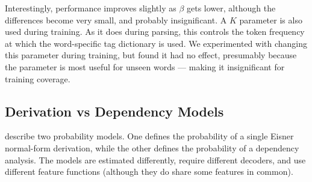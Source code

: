 Interestingly, performance improves slightly as $\beta$ gets lower, although the
differences become very small, and probably insignificant. A $K$ parameter is
also used during training. As it does during parsing, this controls the token
frequency at which the word-specific tag dictionary is used. We experimented
with changing this parameter during training, but found it had no effect,
presumably because the parameter is most useful for unseen words --- making it
insignificant for training coverage.
% 
% 
% 
% 

\subsection{Derivation vs Dependency Models}
\label{sec:deriv_deps}
\citeauthor{clark:cl07} describe two probability models. One defines the probability
of a single Eisner normal-form \citep{eisner:96} derivation, while the other defines
the probability of a dependency analysis. The models are estimated differently, require
different decoders, and use different feature functions (although they do share some
features in common).

